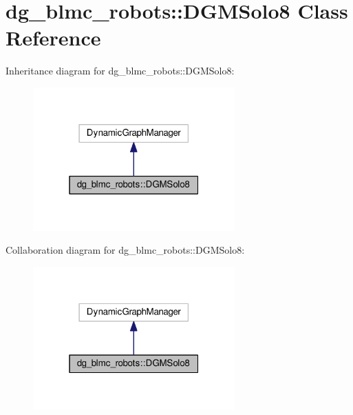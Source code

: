 \hypertarget{classdg__blmc__robots_1_1DGMSolo8}{}\section{dg\+\_\+blmc\+\_\+robots\+:\+:D\+G\+M\+Solo8 Class Reference}
\label{classdg__blmc__robots_1_1DGMSolo8}


Inheritance diagram for dg\+\_\+blmc\+\_\+robots\+:\+:D\+G\+M\+Solo8\+:
\nopagebreak
\begin{figure}[H]
\begin{center}
\leavevmode
\includegraphics[width=220pt]{classdg__blmc__robots_1_1DGMSolo8__inherit__graph}
\end{center}
\end{figure}


Collaboration diagram for dg\+\_\+blmc\+\_\+robots\+:\+:D\+G\+M\+Solo8\+:
\nopagebreak
\begin{figure}[H]
\begin{center}
\leavevmode
\includegraphics[width=220pt]{classdg__blmc__robots_1_1DGMSolo8__coll__graph}
\end{center}
\end{figure}
